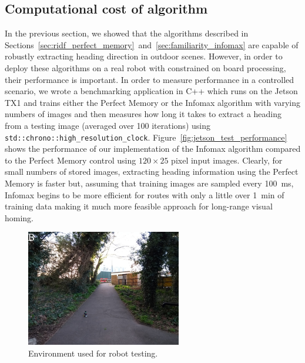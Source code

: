 \documentclass[letterpaper]{article}
\begin{document}
\subsection{Computational cost of algorithm}
In the previous section, we showed that the algorithms described in Sections~\ref{sec:ridf_perfect_memory}~and~\ref{sec:familiarity_infomax} are capable of robustly extracting heading direction in outdoor scenes. 
However, in order to deploy these algorithms on a real robot with constrained on board processing, their performance is important. 
In order to measure performance in a controlled scenario, we wrote a benchmarking application in C++ which runs on the Jetson TX1 and trains either the Perfect Memory or the Infomax algorithm with varying numbers of images and then measures how long it takes to extract a heading from a testing image (averaged over \num{100} iterations) using \lstinline{std::chrono::high_resolution_clock}.
Figure~\ref{fig:jetson_test_performance} shows the performance of our implementation of the Infomax algorithm compared to the Perfect Memory control using $120 \times 25$ pixel input images.
Clearly, for small numbers of stored images, extracting heading information using the Perfect Memory is faster but, assuming that training images are sampled every \SI{100}{\milli\second}, Infomax begins to be more efficient for routes with only a little over \SI{1}{\minute} of training data making it much more feasible approach for long-range visual homing.

\begin{figure}[t]
    \centering
    \includegraphics[height=2in]{figures/robot_environment.jpg}
    \caption{Environment used for robot testing.}
    \label{fig:robot_environment}
\end{figure}
\end{document}
